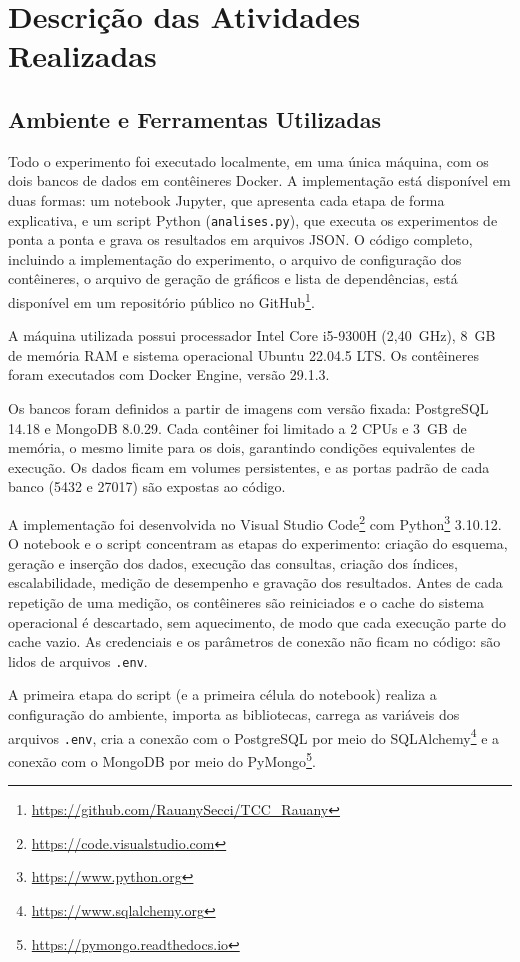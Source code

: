 \section{Descrição das Atividades Realizadas}
\label{sec:atividades}

\subsection{Ambiente e Ferramentas Utilizadas}

Todo o experimento foi executado localmente, em uma única máquina, com os dois bancos de dados em
contêineres Docker. A implementação está disponível em duas formas: um notebook Jupyter, que apresenta
cada etapa de forma explicativa, e um script Python (\texttt{analises.py}), que executa os experimentos
de ponta a ponta e grava os resultados em arquivos JSON. O código completo, incluindo a implementação do experimento,
o arquivo de configuração dos contêineres, o arquivo de geração de gráficos e lista de dependências, está disponível em um
repositório público no GitHub\footnote{\url{https://github.com/RauanySecci/TCC_Rauany}}.

A máquina utilizada possui processador Intel Core i5-9300H (2,40~GHz), 8~GB de memória RAM e sistema operacional
Ubuntu 22.04.5 LTS. Os contêineres foram executados com Docker Engine, versão 29.1.3.

Os bancos foram definidos a partir de imagens com versão fixada: PostgreSQL 14.18 e MongoDB 8.0.29.
Cada contêiner foi limitado a 2 CPUs e 3~GB de memória, o mesmo limite para os dois, garantindo
condições equivalentes de execução. Os dados ficam em
volumes persistentes, e as portas padrão de cada banco (5432 e 27017) são expostas ao código.

A implementação foi desenvolvida no Visual Studio Code\footnote{\url{https://code.visualstudio.com}}
com Python\footnote{\url{https://www.python.org}} 3.10.12. O notebook e o script concentram as etapas do
experimento: criação do esquema, geração e inserção dos dados, execução das consultas, criação dos
índices, escalabilidade, medição de desempenho e gravação dos resultados. Antes de cada repetição de uma medição, os
contêineres são reiniciados e o cache do sistema operacional é descartado, sem aquecimento, de modo que
cada execução parte do cache vazio. As credenciais e os parâmetros de conexão não ficam no
código: são lidos de arquivos \texttt{.env}.

A primeira etapa do script (e a primeira célula do notebook) realiza a configuração do ambiente, importa as bibliotecas, carrega as variáveis dos arquivos \texttt{.env}, cria a conexão com o
PostgreSQL por meio do SQLAlchemy\footnote{\url{https://www.sqlalchemy.org}} e a conexão com o MongoDB por meio do PyMongo\footnote{\url{https://pymongo.readthedocs.io}}.


